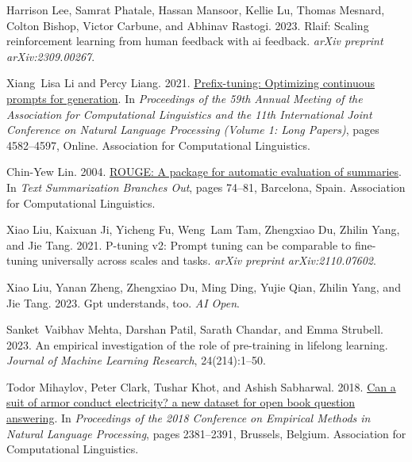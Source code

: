 \documentclass[11pt]{article}
\begin{document}
\begin{thebibliography}{88}
    Harrison Lee, Samrat Phatale, Hassan Mansoor, Kellie Lu, Thomas Mesnard, Colton Bishop, Victor Carbune, and Abhinav Rastogi. 2023.
    \newblock Rlaif: Scaling reinforcement learning from human feedback with ai feedback.
    \newblock \emph{arXiv preprint arXiv:2309.00267}.
    
    Xiang~Lisa Li and Percy Liang. 2021.
    \newblock \href {https://doi.org/10.18653/v1/2021.acl-long.353} {Prefix-tuning: Optimizing continuous prompts for generation}.
    \newblock In \emph{Proceedings of the 59th Annual Meeting of the Association for Computational Linguistics and the 11th International Joint Conference on Natural Language Processing (Volume 1: Long Papers)}, pages 4582--4597, Online. Association for Computational Linguistics.
    
    Chin-Yew Lin. 2004.
    \newblock \href {https://aclanthology.org/W04-1013} {{ROUGE}: A package for automatic evaluation of summaries}.
    \newblock In \emph{Text Summarization Branches Out}, pages 74--81, Barcelona, Spain. Association for Computational Linguistics.
    
    Xiao Liu, Kaixuan Ji, Yicheng Fu, Weng~Lam Tam, Zhengxiao Du, Zhilin Yang, and Jie Tang. 2021.
    \newblock P-tuning v2: Prompt tuning can be comparable to fine-tuning universally across scales and tasks.
    \newblock \emph{arXiv preprint arXiv:2110.07602}.
    
    Xiao Liu, Yanan Zheng, Zhengxiao Du, Ming Ding, Yujie Qian, Zhilin Yang, and Jie Tang. 2023.
    \newblock Gpt understands, too.
    \newblock \emph{AI Open}.
    
    Sanket~Vaibhav Mehta, Darshan Patil, Sarath Chandar, and Emma Strubell. 2023.
    \newblock An empirical investigation of the role of pre-training in lifelong learning.
    \newblock \emph{Journal of Machine Learning Research}, 24(214):1--50.
    
    Todor Mihaylov, Peter Clark, Tushar Khot, and Ashish Sabharwal. 2018.
    \newblock \href {https://doi.org/10.18653/v1/D18-1260} {Can a suit of armor conduct electricity? a new dataset for open book question answering}.
    \newblock In \emph{Proceedings of the 2018 Conference on Empirical Methods in Natural Language Processing}, pages 2381--2391, Brussels, Belgium. Association for Computational Linguistics.
    

\end{thebibliography}
\end{document}
